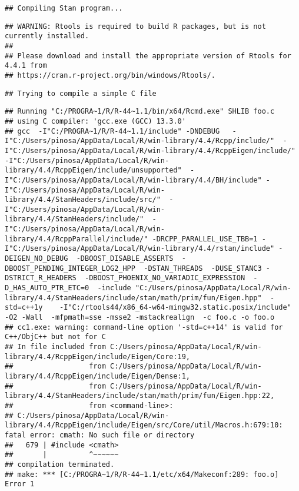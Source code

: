 \documentclass[
]{article}
\begin{document}
\begin{verbatim}
## Compiling Stan program...
\end{verbatim}

\begin{verbatim}
## WARNING: Rtools is required to build R packages, but is not currently installed.
## 
## Please download and install the appropriate version of Rtools for 4.4.1 from
## https://cran.r-project.org/bin/windows/Rtools/.
\end{verbatim}

\begin{verbatim}
## Trying to compile a simple C file
\end{verbatim}

\begin{verbatim}
## Running "C:/PROGRA~1/R/R-44~1.1/bin/x64/Rcmd.exe" SHLIB foo.c
## using C compiler: 'gcc.exe (GCC) 13.3.0'
## gcc  -I"C:/PROGRA~1/R/R-44~1.1/include" -DNDEBUG   -I"C:/Users/pinosa/AppData/Local/R/win-library/4.4/Rcpp/include/"  -I"C:/Users/pinosa/AppData/Local/R/win-library/4.4/RcppEigen/include/"  -I"C:/Users/pinosa/AppData/Local/R/win-library/4.4/RcppEigen/include/unsupported"  -I"C:/Users/pinosa/AppData/Local/R/win-library/4.4/BH/include" -I"C:/Users/pinosa/AppData/Local/R/win-library/4.4/StanHeaders/include/src/"  -I"C:/Users/pinosa/AppData/Local/R/win-library/4.4/StanHeaders/include/"  -I"C:/Users/pinosa/AppData/Local/R/win-library/4.4/RcppParallel/include/" -DRCPP_PARALLEL_USE_TBB=1 -I"C:/Users/pinosa/AppData/Local/R/win-library/4.4/rstan/include" -DEIGEN_NO_DEBUG  -DBOOST_DISABLE_ASSERTS  -DBOOST_PENDING_INTEGER_LOG2_HPP  -DSTAN_THREADS  -DUSE_STANC3 -DSTRICT_R_HEADERS  -DBOOST_PHOENIX_NO_VARIADIC_EXPRESSION  -D_HAS_AUTO_PTR_ETC=0  -include "C:/Users/pinosa/AppData/Local/R/win-library/4.4/StanHeaders/include/stan/math/prim/fun/Eigen.hpp"  -std=c++1y    -I"C:/rtools44/x86_64-w64-mingw32.static.posix/include"     -O2 -Wall  -mfpmath=sse -msse2 -mstackrealign  -c foo.c -o foo.o
## cc1.exe: warning: command-line option '-std=c++14' is valid for C++/ObjC++ but not for C
## In file included from C:/Users/pinosa/AppData/Local/R/win-library/4.4/RcppEigen/include/Eigen/Core:19,
##                  from C:/Users/pinosa/AppData/Local/R/win-library/4.4/RcppEigen/include/Eigen/Dense:1,
##                  from C:/Users/pinosa/AppData/Local/R/win-library/4.4/StanHeaders/include/stan/math/prim/fun/Eigen.hpp:22,
##                  from <command-line>:
## C:/Users/pinosa/AppData/Local/R/win-library/4.4/RcppEigen/include/Eigen/src/Core/util/Macros.h:679:10: fatal error: cmath: No such file or directory
##   679 | #include <cmath>
##       |          ^~~~~~~
## compilation terminated.
## make: *** [C:/PROGRA~1/R/R-44~1.1/etc/x64/Makeconf:289: foo.o] Error 1
\end{verbatim}
\end{document}
